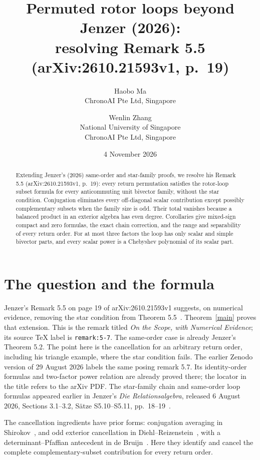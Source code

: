 \documentclass[11pt]{article}
\title{Permuted rotor loops beyond Jenzer (2026):\\
resolving Remark 5.5\\
(arXiv:2610.21593v1, p.~19)}
\author{Haobo Ma\\\small ChronoAI Pte Ltd, Singapore
\and Wenlin Zhang\\\small National University of Singapore\\\small ChronoAI Pte Ltd, Singapore}
\date{4 November 2026}
\begin{document}
\maketitle
\begin{abstract}
Extending Jenzer's (2026) same-order and star-family proofs, we resolve
his Remark 5.5 (arXiv:2610.21593v1, p.~19): every return permutation
satisfies the rotor-loop subset formula for every anticommuting unit
bivector family, without the star condition.
Conjugation eliminates every off-diagonal scalar contribution except
possibly complementary subsets when the family size is odd. Their total
vanishes because a balanced product in an exterior algebra has even degree.
Corollaries give mixed-sign compact and zero formulas, the exact chain
correction, and the range and separability of every return order.
For at most three factors the loop has only scalar and simple bivector
parts, and every scalar power is a Chebyshev polynomial of its scalar part.
\end{abstract}

\section{The question and the formula}
Jenzer's Remark 5.5 on page 19 of arXiv:2610.21593v1 suggests, on numerical
evidence, removing the star condition from Theorem 5.5~\cite{Jenzer}.
Theorem~\ref{main} proves that extension. This is the remark titled \emph{On the Scope, with
Numerical Evidence}; its source TeX label is \texttt{remark:5-7}.
The same-order case is already Jenzer's Theorem 5.2. The point here is
the cancellation for an arbitrary return order, including his triangle
example, where the star condition fails.
The earlier Zenodo version of 29 August 2026 labels the same posing
remark 5.7. Its identity-order formulas and two-factor power relation are
already proved there; the locator in the title refers to the arXiv PDF.
The star-family chain and same-order loop formulas appeared earlier in
Jenzer's \emph{Die Relationsalgebra}, released 6 August 2026,
Sections 3.1--3.2, S\"atze S5.10--S5.11, pp.~18--19~\cite{JenzerBand5}.

The cancellation ingredients have prior forms: conjugation averaging in
Shirokov~\cite[Theorem 3.2]{Shirokov}, and odd exterior cancellation in
Diehl--Reizenstein~\cite[Section 3.3, Lemma 22]{DR}, with a
determinant--Pfaffian antecedent in de Bruijn~\cite[Section 4]{deBruijn}.
Here they identify and cancel the complete complementary-subset contribution
for every return order.
\end{document}
